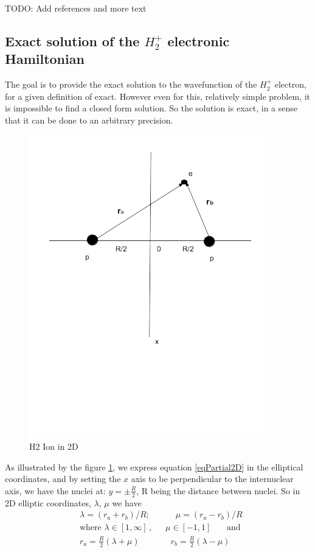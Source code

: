 TODO: Add references and more text

\subsection{Exact solution of the  $ H_2^{+} $ electronic Hamiltonian}

The goal is to provide the exact solution to the wavefunction of the $ H_2^{+} $ electron, for a given definition of exact. However even for this, relatively simple problem, it is impossible to find a closed form solution. So the solution is exact, in a sense that it can be done to an arbitrary precision.

\begin{figure}
  \includegraphics{H2Ion2D.png}
  \caption{H2 Ion in 2D} \label{h2ion2d}
\end{figure}

As illustrated by the figure \ref{h2ion2d}, we express equation \eqref{eqPartial2D} in the elliptical coordinates, and by setting the $ x $ axis to be perpendicular to the internuclear axis, we have the nuclei at: $ y = \pm \frac{R}{2}  $, R being the distance between nuclei. So in  2D elliptic coordinates, $ \lambda $, $ \mu $ we have 
\begin{equation}\label{variables1}
\begin{split}
& \lambda = \left(r_a + r_b\right)/R;\,\,\,\,\,\,\,\,\,\,\,\,\,\,\,\,\,\,\mu =  \left(r_a - r_b\right)/R  \\[1em]
& \text{where } \lambda \in \left[1,\infty\right]\,,\,\,\,\,\,\,\,\,\,\mu \in \left[ -1, 1 \right]\,\,\,\,\,\,\,\,\,\text{ and } \\[.8em] 
& r_a = \frac{R}{2}\left(\lambda + \mu \right)\,\,\,\,\,\,\,\,\,\,\,\,\,\,\,\,\,\,\,\,\,\, r_b = \frac{R}{2}\left(\lambda - \mu \right)
\end{split}
\end{equation}

